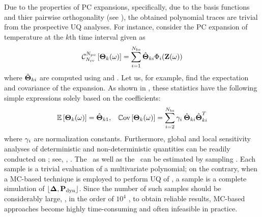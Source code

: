 Due to the properties of PC expansions, specifically, due to the basis functions and thier pairwise orthogonality (see ), the obtained polynomial traces are trivial from the prospective UQ analyses. For instance, consider the PC expansion of temperature at the $k$th time interval given as
\begin{equation} \elabel{pc-k}
  \oPC{\vars}{\pcorder}{\vTO_k(\o)} = \sum_{i = 1}^{\pcterms} \pcc{\vTO}_{ki} \pcb_i(\vZ(\o))
\end{equation}
where $\hat{{\boldsymbol\Theta}}_{ki}$ are computed using  and . Let us, for example, find the expectation and covariance of the expansion. As shown in , these statistics have the following simple expressions solely based on the coefficients:
\begin{align*}
  & \mathbb{E}\left[{\boldsymbol\Theta}_k(\omega)\right] = \hat{{\boldsymbol\Theta}}_{k1}, & \mathbb{C}\text{ov}\left[{\boldsymbol\Theta}_k(\omega)\right] = \sum_{i = 2}^{{N_\text{bs}}} \gamma_i \: \hat{{\boldsymbol\Theta}}_{ki} \hat{{\boldsymbol\Theta}}_{ki}^T
\end{align*}
where $\gamma_i$ are normalization constants. Furthermore, global and local sensitivity analyses of deterministic and non-deterministic quantities can be readily conducted on ; see, \eg, \cite{eldred2009, maitre2010}. The \cdf\ as well as the \pdf\ can be estimated by sampling . Each sample is a trivial evaluation of a multivariate polynomial; on the contrary, when a MC-based technique is employed to perform UQ of , a sample is a complete simulation of $\profPdyn$. Since the number of such samples should be considerably large, \eg, in the order of $10^4$ \cite{xiu2010, diaz-emparanza2002}, to obtain reliable results, MC-based approaches become highly time-consuming and often infeasible in practice.
